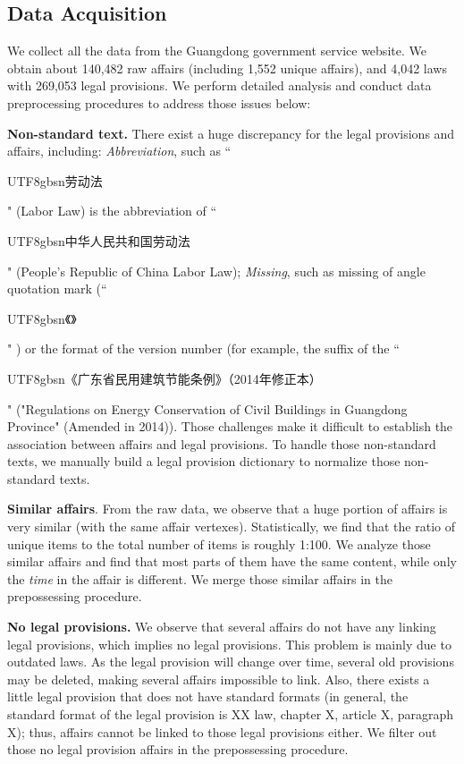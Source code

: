 \documentclass[runningheads]{llncs}
\begin{document}
\subsection{Data Acquisition}
We collect all the data from the Guangdong government service website. We obtain about 140,482 raw affairs (including 1,552 unique affairs), and 4,042 laws with 269,053 legal provisions. We perform  detailed  analysis and conduct  data preprocessing procedures to address those  issues below:

\textbf{Non-standard text.} There exist a huge discrepancy for the legal provisions and affairs, including: \emph{Abbreviation}, such as ``\begin{CJK}{UTF8}{gbsn}劳动法\end{CJK}" (Labor Law) is the abbreviation of ``\begin{CJK}{UTF8}{gbsn}中华人民共和国劳动法\end{CJK}" (People's Republic of China Labor Law); \emph{Missing}, such as missing of angle quotation mark (``\begin{CJK}{UTF8}{gbsn}《》\end{CJK}" ) or the format of the version number (for example, the suffix of the ``\begin{CJK}{UTF8}{gbsn}《广东省民用建筑节能条例》（2014年修正本）\end{CJK}" ("Regulations on Energy Conservation of Civil Buildings in Guangdong Province" (Amended in 2014)). Those challenges make it difficult to establish the association between affairs and legal provisions. To handle those non-standard texts, we manually build a legal provision dictionary to normalize those non-standard texts. 

\textbf{Similar affairs}. From the raw data, we observe that a huge portion of affairs is very similar (with the same affair vertexes). Statistically, we find that the ratio of unique items to the total number of items is roughly 1:100.  We analyze those similar affairs and find that most parts of them have the same content, while only the \emph{time} in the affair is different. We merge those similar affairs in the prepossessing procedure. 

\textbf{No legal provisions.} We observe that several affairs do not have any linking legal provisions, which implies no legal provisions. This problem is mainly due to outdated laws. As the legal provision will change over time,  several old provisions may be deleted, making several affairs impossible to link.  Also, there exists a little legal provision that does not have standard formats (in general, the standard format of the legal provision is XX law, chapter X, article X, paragraph X); thus, affairs cannot be linked to those legal provisions either. We filter out those no legal provision affairs in the prepossessing procedure. 
\end{document}
